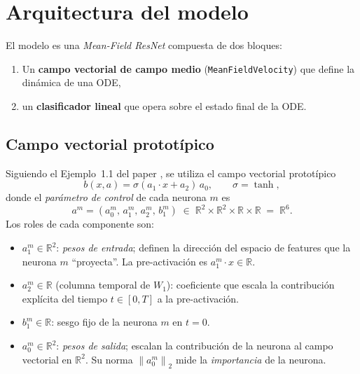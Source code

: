\documentclass[11pt, a4paper]{article}
\theoremstyle{definition}
\newcommand{\R}{\mathbb{R}}
\newcommand{\norm}[1]{\left\|#1\right\|}
\begin{document}
\section{Arquitectura del modelo}
\label{sec:arquitectura}

El modelo es una \emph{Mean-Field ResNet} compuesta de dos bloques:
\begin{enumerate}
  \item Un \textbf{campo vectorial de campo medio} (\texttt{MeanFieldVelocity})
        que define la dinámica de una ODE,
  \item un \textbf{clasificador lineal} que opera sobre el estado final de la ODE.
\end{enumerate}

\subsection{Campo vectorial prototípico}
\label{sec:velocity}

Siguiendo el Ejemplo~1.1 del paper \cite{daudin2025}, se utiliza el campo
vectorial prototípico
\begin{equation}
  b(x, a) = \sigma(a_1 \cdot x + a_2)\, a_0,
  \qquad
  \sigma = \tanh,
\end{equation}
donde el \emph{parámetro de control} de cada neurona $m$ es
\begin{equation}
  a^m = (a_0^m,\, a_1^m,\, a_2^m,\, b_1^m)
  \;\in\; \R^2 \times \R^2 \times \R \times \R \;=\; \R^6.
\end{equation}
Los roles de cada componente son:
\begin{itemize}
  \item $a_1^m \in \R^2$: \emph{pesos de entrada}; definen la dirección del
        espacio de features que la neurona $m$ ``proyecta''. La
        pre-activación es $a_1^m \cdot x \in \R$.
  \item $a_2^m \in \R$ (columna temporal de $W_1$): coeficiente que escala la
        contribución explícita del tiempo $t \in [0,T]$ a la pre-activación.
  \item $b_1^m \in \R$: sesgo fijo de la neurona $m$ en $t=0$.
  \item $a_0^m \in \R^2$: \emph{pesos de salida}; escalan la contribución de la
        neurona al campo vectorial en $\R^2$. Su norma $\norm{a_0^m}_2$ mide la
        \emph{importancia} de la neurona.
\end{itemize}
\end{document}
